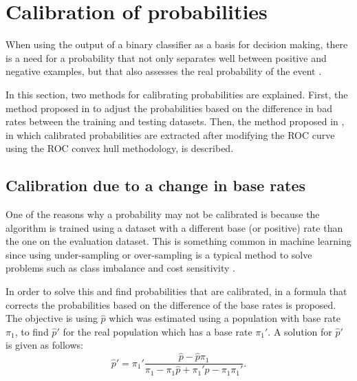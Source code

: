 \section{Calibration of probabilities}
\label{sec:6:prob}

When using the output of a binary classifier as a basis for decision making, there is a 
need for a probability that not only separates well between positive and negative examples, but 
that also assesses the real probability of the event \citep{cohen2004}.

In this section, two methods for calibrating probabilities are explained. First, the method proposed 
in \citep{Elkan2001} to adjust the probabilities based on the   difference in bad rates  between the 
training and testing datasets.  Then, the method proposed in \cite{Hernandez-Orallo2012}, in which 
calibrated probabilities are extracted after modifying the ROC curve using the ROC convex hull 
methodology, is described.
 
\subsection{Calibration due to a change in base rates}

One of the reasons why a probability may not be calibrated is because the algorithm is trained 
using a dataset with a different base (or positive) rate than the one on the evaluation dataset.  
This is something common in machine learning since using under-sampling or over-sampling is a 
typical method to solve problems such as class imbalance and cost sensitivity \citep{Hulse2007}.
  
In order to solve this and find probabilities that are calibrated, in \citep{Elkan2001} a formula  
that corrects the probabilities based on the difference of the base rates is proposed.  The 
objective is using $\hat p$ which was estimated using a population with base rate $\pi_1$,
to find $\hat p'$ for the real population which has a base rate $\pi_1'$. A solution for $\hat p'$ 
is given as follows:
\begin{equation}
  \hat p'=\pi_1' \frac{\hat p - \hat p \pi_1}{\pi_1- \pi_1 \hat p +\pi_1' \hat p - \pi_1 \pi_1'}.
\end{equation}

  
